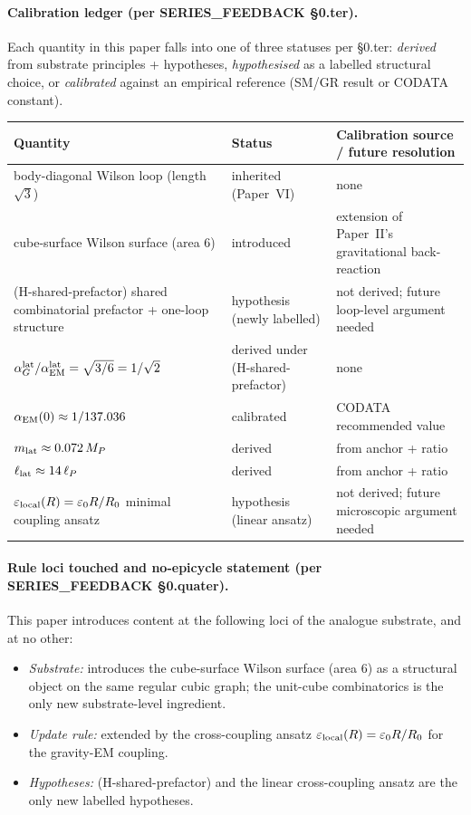 \documentclass[11pt,a4paper]{article}
\begin{document}
\paragraph{Calibration ledger (per SERIES\_FEEDBACK §0.ter).}
Each quantity in this paper falls into one of three statuses
per §0.ter: \emph{derived} from substrate principles +
hypotheses, \emph{hypothesised} as a labelled structural
choice, or \emph{calibrated} against an empirical reference
(SM/GR result or CODATA constant).

\begin{center}
\begin{tabular}{p{3.6cm}p{2.8cm}p{6.8cm}}
\toprule
Quantity & Status & Calibration source / future resolution \\
\midrule
body-diagonal Wilson loop (length $\sqrt{3}$) & inherited (Paper~VI) & none \\
cube-surface Wilson surface (area 6) & introduced & extension of Paper~II's gravitational back-reaction \\
(H-shared-prefactor) shared combinatorial prefactor + one-loop structure & hypothesis (newly labelled) & not derived; future loop-level argument needed \\
$\alpha_G^{\rm lat}/\alpha_{\rm EM}^{\rm lat} = \sqrt{3/6} = 1/\sqrt{2}$ & derived under (H-shared-prefactor) & none \\
$\alpha_{\rm EM}(0) \approx 1/137.036$ & calibrated & CODATA recommended value \\
$m_{\rm lat} \approx 0.072\,M_P$ & derived & from anchor + ratio \\
$\ell_{\rm lat} \approx 14\,\ell_P$ & derived & from anchor + ratio \\
$\varepsilon_{\rm local}(R) = \varepsilon_0 R/R_0$ minimal coupling ansatz & hypothesis (linear ansatz) & not derived; future microscopic argument needed \\
\bottomrule
\end{tabular}
\end{center}


\paragraph{Rule loci touched and no-epicycle statement (per SERIES\_FEEDBACK §0.quater).}
This paper introduces content at the following loci of the
analogue substrate, and at no other:

\begin{itemize}
\item \emph{Substrate:} introduces the cube-surface Wilson surface (area 6) as a structural object on the same regular cubic graph; the unit-cube combinatorics is the only new substrate-level ingredient.
\item \emph{Update rule:} extended by the cross-coupling ansatz $\varepsilon_{\rm local}(R) = \varepsilon_0 R/R_0$ for the gravity-EM coupling.
\item \emph{Hypotheses:} (H-shared-prefactor) and the linear cross-coupling ansatz are the only new labelled hypotheses.
\end{itemize}
\end{document}
